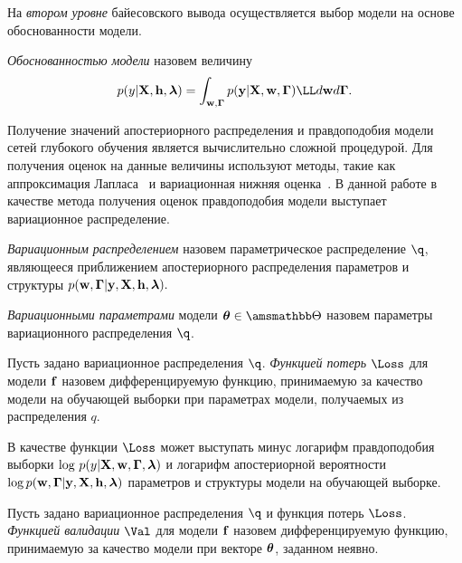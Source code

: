 На \textit{втором уровне} байесовского вывода осуществляется выбор модели на основе обоснованности модели.
\begin{defin}
\textit{Обоснованностью модели }назовем величину
\begin{equation}
\label{eq:evidence}
p(y|\mathbf{X}, \mathbf{h}, \lam) = \int_{\mathbf{w}, \boldsymbol{\Gamma}} p(\mathbf{y}|\mathbf{X}, \mathbf{w}, \boldsymbol{\Gamma}) \LL d\mathbf{w}d\boldsymbol{\Gamma}.
\end{equation}
\end{defin}
Получение значений апостериорного распределения и правдоподобия модели сетей глубокого обучения является вычислительно сложной процедурой. Для получения оценок на данные величины используют методы, такие как аппроксимация Лапласа~\cite{tokmakova} и вариационная нижняя оценка~\cite{nips}.  В данной работе в качестве метода получения оценок правдоподобия модели выступает вариационное распределение.

\begin{defin}
\textit{Вариационным распределением} назовем параметрическое распределение $\q$, являющееся приближением  апостериорного распределения параметров и структуры $p(\mathbf{w}, \boldsymbol{\Gamma}|\mathbf{y}, \mathbf{X}, \mathbf{h},\boldsymbol{\lambda}).$ 
\end{defin}

\begin{defin}
\textit{Вариационными параметрами} модели $\teta \in \Tetab$ назовем параметры вариационного распределения $\q$.
\end{defin} 

\begin{defin}
\label{def:l}
Пусть задано вариационное распределения $\q$.
\textit{Функцией потерь} $\Loss$ для модели $\mathbf{f}$ назовем дифференцируемую функцию, принимаемую за качество модели на обучающей выборки при параметрах модели, получаемых из  распределения $q$.
\end{defin}

В качестве функции $\Loss$ может выступать минус логарифм правдоподобия выборки $\text{log}~p(y|\mathbf{X}, \mathbf{w}, \boldsymbol{\Gamma}, \boldsymbol{\lambda})$  и логарифм апостериорной вероятности $\log p(\mathbf{w}, \boldsymbol{\Gamma}|\mathbf{y}, \mathbf{X}, \mathbf{h},\boldsymbol{\lambda})$ параметров и структуры модели на обучающей выборке.

\begin{defin}
\label{def:q}
Пусть задано вариационное распределения $\q$ и функция потерь $\Loss$. 
\textit{Функцией валидации} $\Val$ для модели $\mathbf{f}$ назовем дифференцируемую функцию, принимаемую за качество модели при векторе $\boldsymbol{\theta}$, заданном неявно.
\end{defin}

